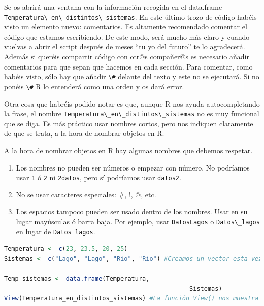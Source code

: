 \documentclass[
]{book}
\newcommand{\passthrough}[1]{#1}
\providecommand{\tightlist}{%
  \setlength{\itemsep}{0pt}\setlength{\parskip}{0pt}}
\begin{document}
Se os abrirá una ventana con la información recogida en el data.frame \passthrough{\lstinline!Temperatura\_en\_distintos\_sistemas!}. En este último trozo de código habéis visto un elemento nuevo: comentarios. Es altamente recomendado comentar el código que estamos escribiendo. De este modo, será mucho más claro y cuando vuelvas a abrir el script después de meses ``tu yo del futuro'' te lo agradecerá. Además si queréis compartir código con otr@s compañer@s es necesario añadir comentarios para que sepan que hacemos en cada sección. Para comentar, como habéis visto, sólo hay que añadir \passthrough{\lstinline!\#!} delante del texto y este no se ejecutará. Si no ponéis \passthrough{\lstinline!\#!} R lo entenderá como una orden y os dará error.

Otra cosa que habréis podido notar es que, aunque R nos ayuda autocompletando la frase, el nombre \passthrough{\lstinline!Temperatura\_en\_distintos\_sistemas!} no es muy funcional que se diga. Es más práctico usar nombres cortos, pero nos indiquen claramente de que se trata, a la hora de nombrar objetos en R.

A la hora de nombrar objetos en R hay algunas nombres que debemos respetar.

\begin{enumerate}
\def\labelenumi{\arabic{enumi}.}
\tightlist
\item
  Los nombres no pueden ser números o empezar con número. No podríamos usar \passthrough{\lstinline!1!} ó \passthrough{\lstinline!2!} ni \passthrough{\lstinline!2datos!}, pero sí podríamos usar \passthrough{\lstinline!datos2!}.
\item
  No se usar caracteres especiales: \#, !, @, etc.
\item
  Los espacios tampoco pueden ser usado dentro de los nombres. Usar en su lugar mayúsculas ó barra baja. Por ejemplo, usar \passthrough{\lstinline!DatosLagos!} o \passthrough{\lstinline!Datos\_lagos!} en lugar de \passthrough{\lstinline!Datos lagos!}.
\end{enumerate}

\begin{lstlisting}[language=R]
Temperatura <- c(23, 23.5, 20, 25)
Sistemas <- c("Lago", "Lago", "Rio", "Rio") #Creamos un vector esta vez de tipo caracter (el texto va entre comillas)

Temp_sistemas <- data.frame(Temperatura,
                                                   Sistemas)
View(Temperatura_en_distintos_sistemas) #La función View() nos muestra el objeto que deseemos.
\end{lstlisting}
\end{document}
